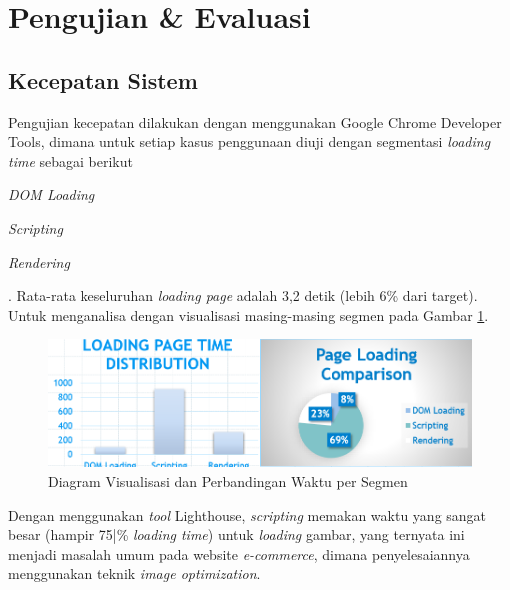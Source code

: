\section{Pengujian \& Evaluasi}

\subsection{Kecepatan Sistem}
Pengujian kecepatan dilakukan dengan menggunakan Google Chrome Developer Tools, dimana untuk setiap kasus penggunaan diuji dengan segmentasi \textit{loading time} sebagai berikut \begin{inlinelist}
	\item \textit{DOM Loading}
	\item \textit{Scripting}
	\item \textit{Rendering}
\end{inlinelist}. Rata-rata keseluruhan \textit{loading page} adalah 3,2 detik (lebih 6\% dari target). Untuk menganalisa dengan visualisasi masing-masing segmen pada Gambar \ref{bar-chart-speed}.
\begin{figure}[h!]
	\centering
	\includegraphics[width=.45\textwidth]{images/bab5/speed/combined.png}
	\caption{Diagram Visualisasi dan Perbandingan Waktu per Segmen}
	\label{bar-chart-speed}
\end{figure}
	Dengan menggunakan \textit{tool} Lighthouse, \textit{scripting} memakan waktu yang sangat besar (hampir 75|\% \textit{loading time}) untuk \textit{loading} gambar, yang ternyata ini menjadi masalah umum pada website \textit{e-commerce}, dimana penyelesaiannya menggunakan teknik \textit{image optimization}.

